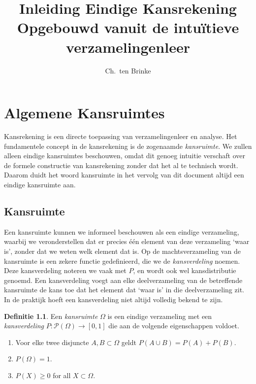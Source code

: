 \documentclass[a4paper]{book}
\title{Inleiding Eindige Kansrekening \\ \small{Opgebouwd vanuit de intu\"itieve verzamelingenleer}}
\author{Ch.\ ten Brinke}
\theoremstyle{definition}
\newtheorem{definition}[theorem]{Definitie}
\begin{document}
\maketitle

\chapter{Algemene Kansruimtes}
Kansrekening is een directe toepassing van verzamelingenleer en analyse.
Het fundamentele concept in de kansrekening is de zogenaamde \emph{kansruimte}.
We zullen alleen eindige kansruimtes beschouwen, omdat dit genoeg intuitie verschaft over de formele constructie van kansrekening zonder dat het al te
technisch wordt.
Daarom duidt het woord kansruimte in het vervolg van dit document altijd een eindige kansruimte aan.



\section{Kansruimte}
Een kansruimte kunnen we informeel beschouwen als een eindige verzameling, waarbij we veronderstellen dat er precies \'e\'en element van deze verzameling `waar is', zonder dat we weten welk element dat is.
Op de machtsverzameling van de kansruimte is een zekere functie gedefinieerd, die we de \emph{kansverdeling} noemen.
Deze kansverdeling noteren we vaak met $P$, en wordt ook wel kansdistributie genoemd.
Een kansverdeling voegt aan elke deelverzameling van de betreffende kansruimte de kans toe dat het element dat `waar is' in die deelverzameling zit.
In de praktijk hoeft een kansverdeling niet altijd volledig bekend te zijn.

\begin{definition}
    Een \emph{kansruimte} $\Omega$ is een eindige verzameling met een \emph{kansverdeling} $P: \mathcal P(\Omega) \to [0,1]$  die aan de volgende eigenschappen voldoet.
    \begin{enumerate}[i]
        \item Voor elke twee disjuncte $A,B \subset \Omega$ geldt $P(A \cup B) = P(A) + P(B)$.
        \item $P(\Omega) = 1$.
        \item $P(X) \geq 0$ for all $X \subset \Omega$.
    \end{enumerate}
\end{definition}
\end{document}
